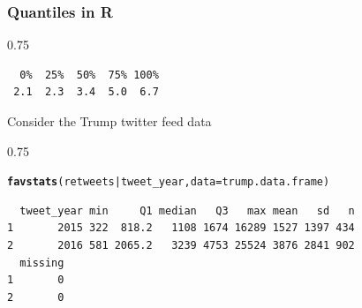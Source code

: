 \documentclass{beamer}\usepackage[]{graphicx}\usepackage[]{color}
\makeatletter
\newcommand{\hlopt}[1]{\textcolor[rgb]{0.102,0.102,0.102}{#1}}%
\newcommand{\hlstd}[1]{\textcolor[rgb]{0.102,0.102,0.102}{#1}}%
\newcommand{\hlkwc}[1]{\textcolor[rgb]{0.2,0.2,0.2}{#1}}%
\newcommand{\hlkwd}[1]{\textcolor[rgb]{0.102,0.102,0.102}{\textbf{#1}}}%
\newenvironment{kframe}{%
 \def\at@end@of@kframe{}%
 \ifinner\ifhmode%
  \def\at@end@of@kframe{\end{minipage}}%
  \begin{minipage}{\columnwidth}%
 \fi\fi%
 \def\FrameCommand##1{\hskip\@totalleftmargin \hskip-\fboxsep
 \colorbox{shadecolor}{##1}\hskip-\fboxsep
     \hskip-\linewidth \hskip-\@totalleftmargin \hskip\columnwidth}%
 \MakeFramed {\advance\hsize-\width
   \@totalleftmargin\z@ \linewidth\hsize
   \@setminipage}}%
 {\par\unskip\endMakeFramed%
 \at@end@of@kframe}
\newenvironment{knitrout}{}{} %
\renewenvironment{knitrout}{\begin{spacing}{0.75}\begin{tiny}}{\end{tiny}\end{spacing}}
\makeatother
\begin{document}
\begin{frame}[fragile]
\frametitle{Quantiles in R}

\begin{knitrout}\small
{}\color{fgcolor}\begin{kframe}
\begin{verbatim}
  0%  25%  50%  75% 100% 
 2.1  2.3  3.4  5.0  6.7 
\end{verbatim}
\end{kframe}
\end{knitrout}

Consider the Trump twitter feed data

\begin{knitrout}\small
{}\color{fgcolor}\begin{kframe}
\begin{alltt}
\hlkwd{favstats}\hlstd{(retweets} \hlopt{|} \hlstd{tweet_year,} \hlkwc{data}\hlstd{=trump.data.frame)}
\end{alltt}
\begin{verbatim}
  tweet_year min     Q1 median   Q3   max mean   sd   n
1       2015 322  818.2   1108 1674 16289 1527 1397 434
2       2016 581 2065.2   3239 4753 25524 3876 2841 902
  missing
1       0
2       0
\end{verbatim}
\end{kframe}
\end{knitrout}
\end{frame}
\end{document}
